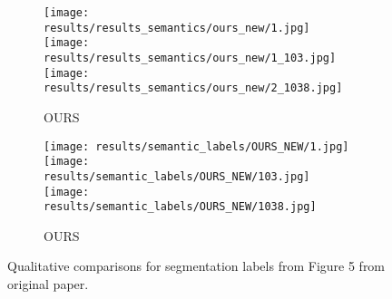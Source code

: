 \begin{figure*}[t!]
\begin{subfigure}[t]{0.105\linewidth}
      \texttt{[image: results/results\_semantics/ours\_new/1.jpg]}
      \texttt{[image: results/results\_semantics/ours\_new/1\_103.jpg]}
      \texttt{[image: results/results\_semantics/ours\_new/2\_1038.jpg]}
      \caption{OURS}
    \end{subfigure}
        \begin{subfigure}[t]{0.105\linewidth}
      \captionsetup{justification=centering, labelformat=empty, font=scriptsize}
      \texttt{[image: results/semantic\_labels/OURS\_NEW/1.jpg]}
      \texttt{[image: results/semantic\_labels/OURS\_NEW/103.jpg]}
      \texttt{[image: results/semantic\_labels/OURS\_NEW/1038.jpg]}
      \caption{OURS}
    \end{subfigure}
    \vspace{-3mm}    
    \caption{Qualitative comparisons for segmentation labels from Figure 5 from original paper. }
    \label{fig:facesematicorig}
  \end{figure*}




